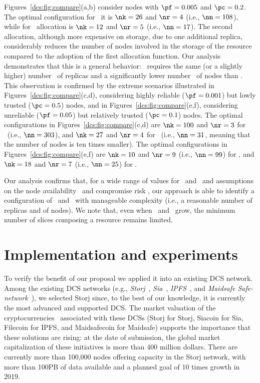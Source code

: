 Figures~\ref{dcs:fig:compare}(a,b) consider nodes with $\pf=0.005$ and
$\pc=0.2$. The optimal configuration for \diagonal\ it is $\nk=26$ and
$\nr=4$ (i.e., $\nn=108$), while for \compact\ allocation is $\nk=12$
and $\nr=5$ (i.e., $\nn=17$). The second allocation, although more
expensive on storage, due to one additional replica, considerably
reduces the number of nodes involved in the storage of the resource
compared to the adoption of the first allocation function. Our
analysis demonstrates that this is a general behavior:
\compact\ requires the same (or a slightly higher) number \R\ of
replicas and a significantly lower number \N\ of nodes than
\diagonal. This observation is confirmed by the extreme scenarios
illustrated in Figures~\ref{dcs:fig:compare}(c,d), considering highly
reliable ($\pf = 0.001$) but lowly trusted ($\pc = 0.5$) nodes, and in
Figures~\ref{dcs:fig:compare}(e,f), considering unreliable ($\pf = 0.05$)
but relatively trusted ($\pc = 0.1$) nodes.  The optimal
configurations in Figures~\ref{dcs:fig:compare}(c,d) are $\nk=100$ and
$\nr=3$ for \diagonal\ (i.e., $\nn=303$), and $\nk=27$ and $\nr=4$ for
\compact\ (i.e., $\nn=31$, meaning that the number of nodes is ten
times smaller). The optimal configurations in
Figures~\ref{dcs:fig:compare}(e,f) are $\nk=10$ and $\nr=9$ (i.e.,
$\nn=99$) for \diagonal, and $\nk=18$ and $\nr=7$ (i.e., $\nn=25$) for
\compact.


Our analysis confirms that, for a wide range of values
for \PF\ and \PC\ and assumptions on the node availability \pf\ and
compromise risk \pc, our approach is able to identify a configuration
of \R\ and \K\ with  manageable complexity (i.e., a reasonable number of replicas and of nodes). We note that, even when
\R\ and \K\ grow, the minimum number of slices composing a resource remains
limited. 




\section[Experiments]{Implementation and experiments}\label{dcs:sect:implementation}
To verify the benefit of our proposal we applied it into an existing
DCS network. Among the existing DCS networks (e.g., {\em
  Storj}~\cite{wilkinson2014storj}, {\em Sia}~\cite{vorick2014sia},
{\em IPFS}~\cite{benet2014ipfs}, and {\em Maidsafe
  Safe-network}~\cite{lambert2014safenetwork}), we selected Storj
since, to the best of our knowledge, it is currently the most advanced
and supported DCS.  The market valuation of the
cryptocurrencies~\cite{cslr18} associated with these DCSs (Storj for
Storj, Siacoin for Sia, Filecoin for IPFS, and Maidsafecoin for
Maidsafe) supports the importance that these solutions are rising: at
the date of submission, the global market capitalization of these
initiatives is more than 400 million dollars.  There are currently
more than 100,000 nodes offering capacity in the Storj network, with
more than 100PB of data available and a planned goal of 10 times
growth in 2019.

